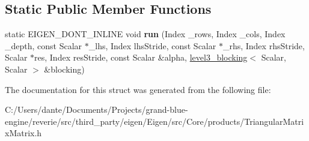 \subsection*{Static Public Member Functions}
\begin{DoxyCompactItemize}
\item 
\mbox{\label{struct_eigen_1_1internal_1_1product__triangular__matrix__matrix_3_01_scalar_00_01_index_00_01_mocecf6b0a946de08ae1ae622ae91f7d88_ab7aa741c66b96e673ac752220132ca15}} 
static E\+I\+G\+E\+N\+\_\+\+D\+O\+N\+T\+\_\+\+I\+N\+L\+I\+NE void {\bfseries run} (Index \+\_\+rows, Index \+\_\+cols, Index \+\_\+depth, const Scalar $\ast$\+\_\+lhs, Index lhs\+Stride, const Scalar $\ast$\+\_\+rhs, Index rhs\+Stride, Scalar $\ast$res, Index res\+Stride, const Scalar \&alpha, \mbox{\hyperlink{class_eigen_1_1internal_1_1level3__blocking}{level3\+\_\+blocking}}$<$ Scalar, Scalar $>$ \&blocking)
\end{DoxyCompactItemize}


The documentation for this struct was generated from the following file\+:\begin{DoxyCompactItemize}
\item 
C\+:/\+Users/dante/\+Documents/\+Projects/grand-\/blue-\/engine/reverie/src/third\+\_\+party/eigen/\+Eigen/src/\+Core/products/Triangular\+Matrix\+Matrix.\+h\end{DoxyCompactItemize}
